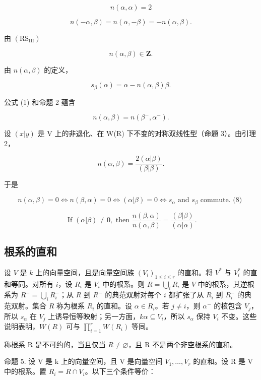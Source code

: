 \[
n (\alpha , \alpha) = 2\tag{2}
\]

\[
n (- \alpha , \beta) = n (\alpha , - \beta) = - n (\alpha , \beta).\tag{3}
\]

由 \((\mathrm{RS}_{\mathrm{III}})\)

\[
n (\alpha , \beta) \in \mathbf {Z}.\tag{4}
\]

由 \(n(\alpha, \beta)\) 的定义，

\[
s _ {\beta} (\alpha) = \alpha - n (\alpha , \beta) \beta .\tag{5}
\]

公式 (1) 和命题 2 蕴含

\[
n (\alpha , \beta) = n \left(\beta^ {-}, \alpha^ {-}\right).\tag{6}
\]

设 \((x|y)\) 是 V 上的非退化、在 W(R) 下不变的对称双线性型（命题 3）。由引理 2，

\[
n (\alpha , \beta) = \frac {2 (\alpha | \beta)}{(\beta | \beta)}.\tag{7}
\]

于是

\[
n (\alpha , \beta) = 0 \Longleftrightarrow n (\beta , \alpha) = 0 \Longleftrightarrow (\alpha | \beta) = 0 \Longleftrightarrow s _ {\alpha} \text {   and   } s _ {\beta} \text {   commute.   (8) }
\]

\[
\text {   If   } (\alpha | \beta) \neq 0, \text {   then   } \frac {n (\beta , \alpha)}{n (\alpha , \beta)} = \frac {(\beta | \beta)}{(\alpha | \alpha)}.\tag{9}
\]

\subsection{根系的直和}

设 \(V\) 是 \(k\) 上的向量空间，且是向量空间族 \((V_i)_{1 \leqslant i \leqslant r}\) 的直和。将 \(V^*\) 与 \(V_i^*\) 的直和等同。对所有 \(i\)，设 \(R_i\) 是 \(V_i\) 中的根系。则 \(R = \bigcup_i R_i\) 是 \(V\) 中的根系，其逆根系为 \(R^- = \bigcup_i R_i^-\)；从 \(R\) 到 \(R^-\) 的典范双射对每个 \(i\) 都扩张了从 \(R_i\) 到 \(R_i^-\) 的典范双射。集合 \(R\) 称为根系 \(R_i\) 的直和。设 \(\alpha \in R_i\)。若 \(j \neq i\)，则 \(\alpha^-\) 的核包含 \(V_j\)，所以 \(s_\alpha\) 在 \(V_j\) 上诱导恒等映射；另一方面，\(k\alpha \subseteq V_i\)，所以 \(s_\alpha\) 保持 \(V_i\) 不变。这些说明表明，\(W(R)\) 可与 \(\prod_{i=1}^{r} W(R_i)\) 等同。

称根系 R 是不可约的，当且仅当 \(R \neq \varnothing\)，且 R 不是两个非空根系的直和。

命题 5. 设 V 是 k 上的向量空间，且 V 是向量空间 \(V_{1}, \ldots, V_{r}\) 的直和。设 R 是 V 中的根系。置 \(R_{i} = R \cap V_{i}\)。以下三个条件等价：

